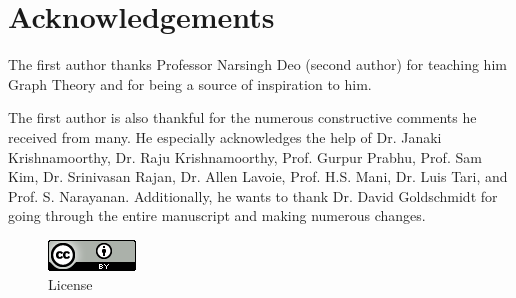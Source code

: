 \chapter*{Acknowledgements}
The first author thanks Professor Narsingh Deo (second author) for teaching him Graph Theory and for being a source of inspiration to him.

The first author is also thankful for the numerous constructive comments he received from many. He especially acknowledges the help of Dr. Janaki Krishnamoorthy, Dr. Raju Krishnamoorthy, Prof. Gurpur Prabhu, Prof. Sam Kim, Dr. Srinivasan Rajan, Dr. Allen Lavoie, Prof. H.S. Mani, Dr. Luis Tari, and Prof. S. Narayanan. Additionally, he wants to thank Dr. David Goldschmidt for going through the entire manuscript and making numerous changes.

\begin{figure}
\begin{center}
\includegraphics{cc-88x31.png}
\caption{License}
\end{center}
\end{figure}